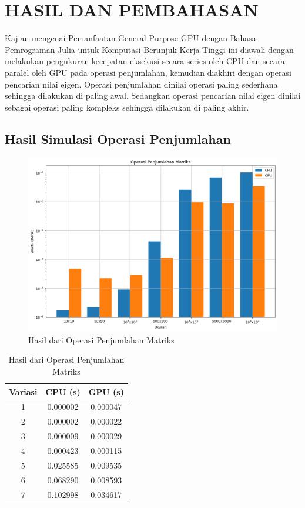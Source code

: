 \chapter{HASIL DAN PEMBAHASAN}

Kajian mengenai Pemanfaatan General Purpose GPU dengan Bahasa Pemrograman Julia untuk Komputasi Berunjuk Kerja Tinggi ini diawali dengan melakukan pengukuran kecepatan eksekusi secara series oleh CPU dan secara paralel oleh GPU pada operasi penjumlahan, kemudian diakhiri dengan operasi pencarian nilai eigen. Operasi penjumlahan dinilai operasi paling sederhana sehingga dilakukan di paling awal. Sedangkan operasi pencarian nilai eigen dinilai sebagai operasi paling kompleks sehingga dilakukan di paling akhir.

\section{Hasil Simulasi Operasi Penjumlahan}

\begin{figure}[H]
	\centering
	\includegraphics[width=14cm, scale=1]{images/penelitian/addition.png}
	\caption{Hasil dari Operasi Penjumlahan Matriks}
	\label{img:result_addition}
\end{figure}

\begin{table}[H]
	\centering
	\caption{Hasil dari Operasi Penjumlahan Matriks}
	\label{tab:result_addition}
	\begin{tabular}{ccc}
		\toprule
		Variasi & CPU (s)  & GPU (s)  \\
		\midrule
		1       & 0.000002 & 0.000047 \\
		2       & 0.000002 & 0.000022 \\
		3       & 0.000009 & 0.000029 \\
		4       & 0.000423 & 0.000115 \\
		5       & 0.025585 & 0.009535 \\
		6       & 0.068290 & 0.008593 \\
		7       & 0.102998 & 0.034617 \\
		\bottomrule
	\end{tabular}
\end{table}

